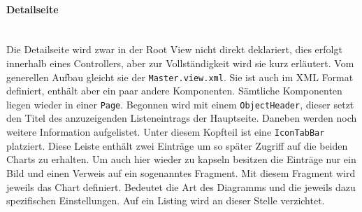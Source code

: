 \paragraph{Detailseite}$\;$ \\
Die Detailseite wird zwar in der Root View nicht direkt deklariert, dies erfolgt innerhalb eines Controllers, aber zur Vollständigkeit wird sie kurz erläutert. Vom generellen Aufbau gleicht sie der \texttt{Master.view.xml}. Sie ist auch im XML Format definiert, enthält aber ein paar andere Komponenten. Sämtliche Komponenten liegen wieder in einer \texttt{Page}. Begonnen wird mit einem \texttt{ObjectHeader}, dieser setzt den Titel des anzuzeigenden Listeneintrags der Hauptseite. Daneben werden noch weitere Information aufgelistet. Unter diesem Kopfteil ist eine \texttt{IconTabBar} platziert. Diese Leiste enthält zwei Einträge um so später Zugriff auf die beiden Charts zu erhalten. Um auch hier wieder zu kapseln besitzen die Einträge nur ein Bild und einen Verweis auf ein sogenanntes Fragment. Mit diesem Fragment wird jeweils das Chart definiert. Bedeutet die Art des Diagramms und die jeweils dazu spezifischen Einstellungen. Auf ein Listing wird an dieser Stelle verzichtet.


